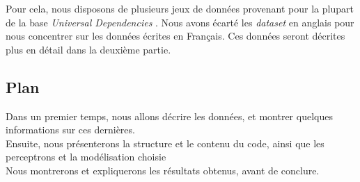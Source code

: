 Pour cela, nous disposons de plusieurs jeux de données provenant pour
la plupart de la base \emph{ Universal Dependencies }. Nous avons
écarté les \emph{dataset} en anglais pour nous concentrer sur les
données écrites en Français. Ces données seront décrites plus en
détail dans la deuxième partie.


\subsection{Plan}
Dans un premier temps, nous allons décrire les données, et montrer
quelques informations sur ces dernières. \\
Ensuite, nous présenterons la structure et le contenu du code, ainsi
que les perceptrons et la modélisation choisie \\
Nous montrerons et expliquerons les résultats obtenus,
avant de conclure.


